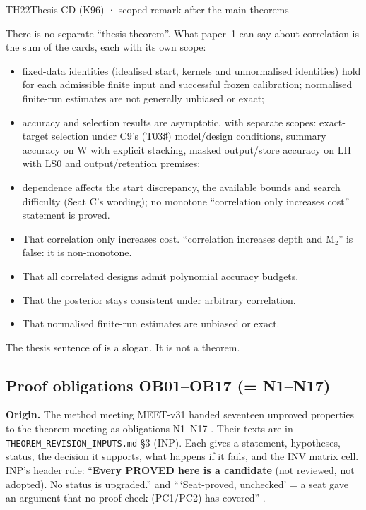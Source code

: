 \begin{card}{TH22}{Thesis CD (K96) · scoped remark after the main theorems}
\begin{plain}
There is no separate ``thesis theorem''. What paper~1 can say about correlation is the sum of the cards, each with its own scope:
\begin{itemize}
\item fixed-data identities (idealised start, kernels and unnormalised identities) hold for each admissible finite input and successful frozen calibration; normalised finite-run estimates are not generally unbiased or exact;
\item accuracy and selection results are asymptotic, with separate scopes: exact-target selection under C9's (T03♯) model/design conditions, summary accuracy on W with explicit stacking, masked output/store accuracy on LH with LS0 and output/retention premises;
\item dependence affects the start discrepancy, the available bounds and search difficulty (Seat C's wording); no monotone ``correlation only increases cost'' statement is proved.
\end{itemize}
\end{plain}
\begin{notproved}
\begin{itemize}
\item That correlation only increases cost. ``correlation increases depth and M₂'' is false: it is non-monotone.
\item That all correlated designs admit polynomial accuracy budgets.
\item That the posterior stays consistent under arbitrary correlation.
\item That normalised finite-run estimates are unbiased or exact.
\end{itemize}
The thesis sentence of  is a slogan. It is not a theorem.
\end{notproved}
\end{card}

\subsection{Proof obligations OB01--OB17 (= N1--N17)}\label{sec:oblig}

\textbf{Origin.} The method meeting MEET-v31 handed seventeen unproved properties to the theorem meeting as obligations N1--N17  . Their texts are in \texttt{THEOREM\_REVISION\_INPUTS.md} §3 (INP). Each gives a statement, hypotheses, status, the decision it supports, what happens if it fails, and the INV matrix cell. INP's header rule: ``\textbf{Every PROVED here is a candidate} (not reviewed, not adopted). No status is upgraded.'' and ``\,`Seat-proved, unchecked' = a seat gave an argument that no proof check (PC1/PC2) has covered'' .

